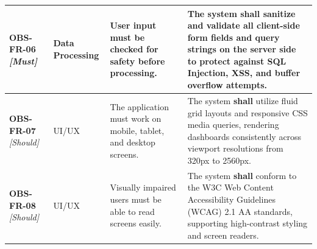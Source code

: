 \documentclass[11pt,a4paper]{article}
\begin{document}
\begin{table}[H]
\begin{tabular}{p{2.0cm} p{2.2cm} p{3.8cm} p{5.4cm}}
\textbf{OBS-FR-06} \newline \textit{\small [Must]} & Data Processing & User input must be checked for safety before processing. & The system \textbf{shall} sanitize and validate all client-side form fields and query strings on the server side to protect against SQL Injection, XSS, and buffer overflow attempts. \\ \midrule

\textbf{OBS-FR-07} \newline \textit{\small [Should]} & UI/UX & The application must work on mobile, tablet, and desktop screens. & The system \textbf{shall} utilize fluid grid layouts and responsive CSS media queries, rendering dashboards consistently across viewport resolutions from 320px to 2560px. \\ \midrule

\textbf{OBS-FR-08} \newline \textit{\small [Should]} & UI/UX & Visually impaired users must be able to read screens easily. & The system \textbf{shall} conform to the W3C Web Content Accessibility Guidelines (WCAG) 2.1 AA standards, supporting high-contrast styling and screen readers. \\ \bottomrule
\end{tabular}
\end{table}
\end{document}
